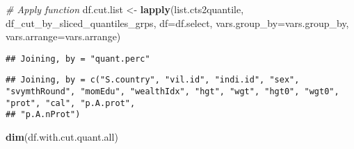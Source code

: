 \documentclass[
]{book}
\newenvironment{Shaded}{\begin{snugshade}}{\end{snugshade}}
\newcommand{\CommentTok}[1]{\textcolor[rgb]{0.56,0.35,0.01}{\textit{#1}}}
\newcommand{\ControlFlowTok}[1]{\textcolor[rgb]{0.13,0.29,0.53}{\textbf{#1}}}
\newcommand{\DataTypeTok}[1]{\textcolor[rgb]{0.13,0.29,0.53}{#1}}
\newcommand{\KeywordTok}[1]{\textcolor[rgb]{0.13,0.29,0.53}{\textbf{#1}}}
\newcommand{\NormalTok}[1]{#1}
\newcommand{\OperatorTok}[1]{\textcolor[rgb]{0.81,0.36,0.00}{\textbf{#1}}}
\newcommand{\StringTok}[1]{\textcolor[rgb]{0.31,0.60,0.02}{#1}}
\begin{document}
\begin{Shaded}
\end{Shaded}

\begin{Shaded}
\begin{Highlighting}[]
\CommentTok{# Apply function}
\NormalTok{df.cut.list <-}\StringTok{ }\KeywordTok{lapply}\NormalTok{(list.cts2quantile, df_cut_by_sliced_quantiles_grps,}
                      \DataTypeTok{df=}\NormalTok{df.select, }\DataTypeTok{vars.group_by=}\NormalTok{vars.group_by, }\DataTypeTok{vars.arrange=}\NormalTok{vars.arrange)}
\end{Highlighting}
\end{Shaded}

\begin{verbatim}
## Joining, by = "quant.perc"
\end{verbatim}

\begin{Shaded}
\end{Shaded}

\begin{verbatim}
## Joining, by = c("S.country", "vil.id", "indi.id", "sex", "svymthRound", "momEdu", "wealthIdx", "hgt", "wgt", "hgt0", "wgt0", "prot", "cal", "p.A.prot",
## "p.A.nProt")
\end{verbatim}

\begin{Shaded}
\begin{Highlighting}[]
\KeywordTok{dim}\NormalTok{(df.with.cut.quant.all)}
\end{Highlighting}
\end{Shaded}
\end{document}
